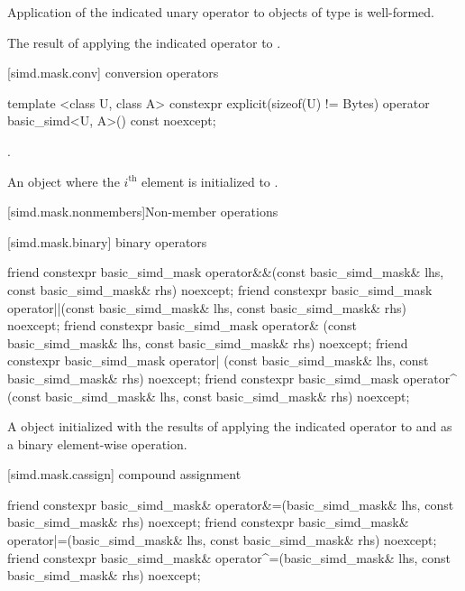 \begin{itemdescr}
  \pnum\constraints
  Application of the indicated unary operator to objects of type  is well-formed.

  \pnum\returns
  The result of applying the indicated operator to .
\end{itemdescr}

[simd.mask.conv]{ conversion operators}

\begin{itemdecl}
template <class U, class A>
  constexpr explicit(sizeof(U) != Bytes) operator basic_simd<U, A>() const noexcept;
\end{itemdecl}

\begin{itemdescr}
  \pnum\constraints
  .

  \pnum\returns
  An object where the $i^\text{th}$ element is initialized to
  .
\end{itemdescr}

[simd.mask.nonmembers]{Non-member operations}

[simd.mask.binary]{ binary operators}

\begin{itemdecl}
friend constexpr basic_simd_mask
  operator&&(const basic_simd_mask& lhs, const basic_simd_mask& rhs) noexcept;
friend constexpr basic_simd_mask
  operator||(const basic_simd_mask& lhs, const basic_simd_mask& rhs) noexcept;
friend constexpr basic_simd_mask
  operator& (const basic_simd_mask& lhs, const basic_simd_mask& rhs) noexcept;
friend constexpr basic_simd_mask
  operator| (const basic_simd_mask& lhs, const basic_simd_mask& rhs) noexcept;
friend constexpr basic_simd_mask
  operator^ (const basic_simd_mask& lhs, const basic_simd_mask& rhs) noexcept;
\end{itemdecl}

\begin{itemdescr}
  \pnum\returns
  A  object initialized with the results of applying the indicated operator
  to  and  as a binary element-wise operation.
\end{itemdescr}

[simd.mask.cassign]{ compound assignment}

\begin{itemdecl}
friend constexpr basic_simd_mask&
  operator&=(basic_simd_mask& lhs, const basic_simd_mask& rhs) noexcept;
friend constexpr basic_simd_mask&
  operator|=(basic_simd_mask& lhs, const basic_simd_mask& rhs) noexcept;
friend constexpr basic_simd_mask&
  operator^=(basic_simd_mask& lhs, const basic_simd_mask& rhs) noexcept;
\end{itemdecl}

